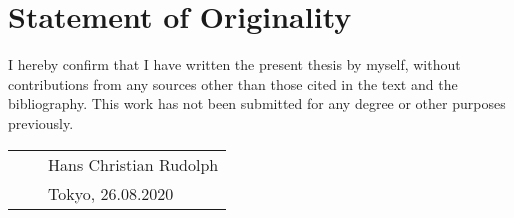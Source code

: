 \chapter{Statement of Originality}

I hereby confirm that I have written the present thesis by myself, without contributions from any sources other than those cited in the text and the bibliography.
This work has not been submitted for any degree or other purposes previously.

\vspace{2cm}

\noindent
\begin{tabular}{@{}p{2.55in}@{}p{1.5in}p{2.55in}@{}}
    & & Hans Christian Rudolph \\
    & & Tokyo, 26.08.2020\\
\end{tabular}